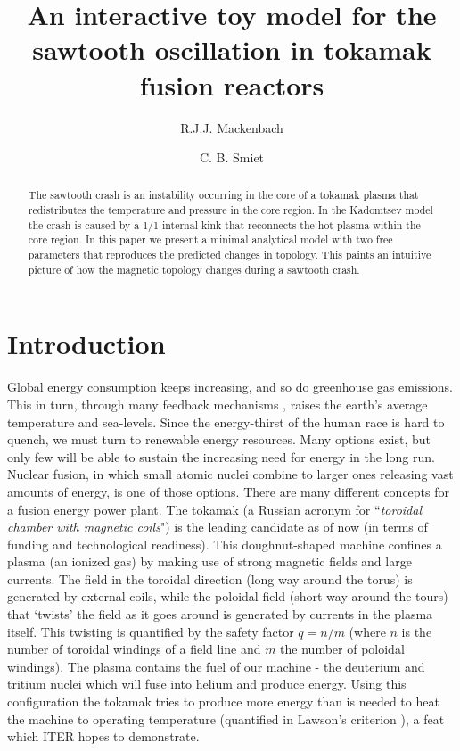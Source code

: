 \documentclass[%
superscriptaddress,
amsmath,amssymb,
aps,
pre,
floatfix,
]{revtex4-2}
\begin{document}
\title{An interactive toy model for the sawtooth oscillation in tokamak fusion reactors}
\author{R.J.J. Mackenbach}
\author{C. B. Smiet}

\begin{abstract}
  The sawtooth crash is an instability occurring in the core of a tokamak plasma that redistributes the temperature and pressure in the core region.
  In the Kadomtsev model the crash is caused by a 1/1 internal kink that reconnects the hot plasma within the core region.
  In this paper we present a minimal analytical model with two free parameters that reproduces the predicted changes in topology.
  This paints an intuitive picture of how the magnetic topology changes during a sawtooth crash.
\end{abstract}
\maketitle


\section{Introduction}
Global energy consumption keeps increasing, and so do greenhouse gas emissions. This in turn, through many feedback mechanisms \cite{Curry1995,Bloom2010}, raises the earth's average temperature and sea-levels. Since the energy-thirst of the human race is hard to quench, we must turn to renewable energy resources. Many options exist, but only few will be able to sustain the increasing need for energy in the long run. Nuclear fusion, in which small atomic nuclei combine to larger ones releasing vast amounts of energy, is one of those options. 
There are many different concepts for a fusion energy power plant. The tokamak (a Russian acronym for ``\textit{toroidal chamber with magnetic coils}") is the leading candidate as of now (in terms of funding and technological readiness). This doughnut-shaped machine confines a plasma (an ionized gas) by making use of strong magnetic fields and large currents. 
The field in the toroidal direction (long way around the torus) is generated by external coils, while the poloidal field (short way around the tours) that `twists' the field as it goes around is generated by currents in the plasma itself. 
This twisting is quantified by the safety factor $q=n/m$ (where $n$ is the number of toroidal windings of a field line and $m$ the number of poloidal windings).
The plasma contains the fuel of our machine - the deuterium and tritium nuclei which will fuse into helium and produce energy. Using this configuration the tokamak tries to produce more energy than is needed to heat the machine to operating temperature (quantified in Lawson's criterion \cite{Lawson1957}), a feat which ITER hopes to demonstrate.
\end{document}
